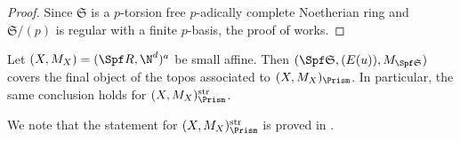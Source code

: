 \begin{proof}
Since $\mathfrak{S}$ is a $p$-torsion free $p$-adically complete Noetherian ring and $\mathfrak{S}/(p)$ is regular with a finite $p$-basis, the proof of \cite[Lem.~2.7]{du-liu-moon-shimizu-completed-prismatic-F-crystal-loc-system} works. 
\end{proof}

\begin{lem}\label{lem:BKcoversfinalobject}
Let $(X,M_X)=(\Spf R,\N^d)^a$ be small affine.
Then $(\Spf\mathfrak{S}, (E(u)), M_{\Spf \mathfrak{S}})$ covers the final object of the topos associated to $(X,M_X)_\Prism$. In particular, the same conclusion holds for $(X,M_X)_\Prism^{\mathrm{str}}$.
\end{lem}

We note that the statement for $(X,M_X)_\Prism^{\mathrm{str}}$ is proved in \cite[Lem.~3.16]{min-wang-HT-crys-log-prism}.

